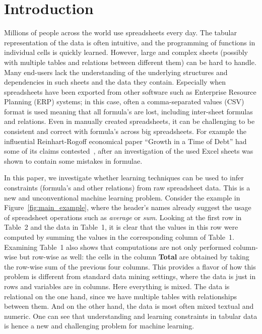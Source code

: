 \documentclass{IEEEtran}
\theoremstyle{definition}
\begin{document}
\section{Introduction}
Millions of people across the world use spreadsheets every day. The tabular representation of the data is often intuitive, and the programming of functions in individual cells is quickly learned. However, large and complex sheets (possibly with multiple tables and relations between different them) can be hard to handle. Many end-users lack the understanding of the underlying structures and dependencies in such sheets and the data they contain. Especially when spreadsheets have been exported from
other software such as Enterprise Resource Planning (ERP) systems; in this case, %
often a comma-separated values (CSV) format is used meaning that all formula's are lost, including inter-sheet formulas and relations.
Even in manually created spreadsheets, it can be challenging to be consistent and correct with formula's across big spreadsheets. For example the influential Reinhart-Rogoff economical paper ``Growth in a Time of Debt'' had some of its claims contested~\cite{flaw_excel}, after an investigation of the used Excel sheets was shown to contain some mistakes in formulae.

In this paper,  we investigate whether learning techniques can be used to infer constraints (formula's and other relations) from raw spreadsheet data.
This is a new and unconventional machine learning problem.
Consider the example in Figure~\ref{fig:main_example}, where the header's names already suggest the usage of spreadsheet operations such as \textit{average} or \textit{sum}.
Looking at the first row in Table~2 and the data in Table~1, it is clear that the values in this row were computed by summing the values in the corresponding column of Table~1.
Examining Table~1 also shows that computations are not only performed column-wise but row-wise as well: the cells in the column \textbf{Total} are obtained by taking the row-wise sum of the previous four columns.
This provides a flavor of how this problem is different from standard data mining settings, where the data is just in rows and variables are in columns. Here everything is mixed. The data is relational on the one hand, since we have multiple tables with relationships between them. And on the other hand, the data is most often mixed textual and numeric. %
One can see that understanding and learning constraints in tabular data is hence a new and challenging problem for machine learning.
\end{document}
